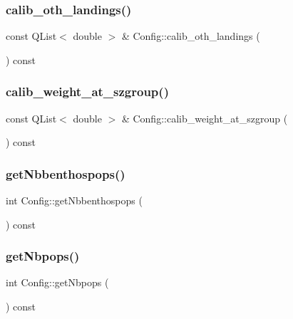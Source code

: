 \subsubsection{\texorpdfstring{calib\_oth\_landings()}{calib\_oth\_landings()}}
{\footnotesize\ttfamily const Q\+List$<$ double $>$ \& Config\+::calib\+\_\+oth\+\_\+landings (\begin{DoxyParamCaption}{ }\end{DoxyParamCaption}) const}

\mbox{\label{class_config_a27d6d3da20e0caa6d8aa74426293e845}} 
\subsubsection{\texorpdfstring{calib\_weight\_at\_szgroup()}{calib\_weight\_at\_szgroup()}}
{\footnotesize\ttfamily const Q\+List$<$ double $>$ \& Config\+::calib\+\_\+weight\+\_\+at\+\_\+szgroup (\begin{DoxyParamCaption}{ }\end{DoxyParamCaption}) const}

\mbox{\label{class_config_a195f6e3a5e3a3e35a41716ec53fa0365}} 
\subsubsection{\texorpdfstring{getNbbenthospops()}{getNbbenthospops()}}
{\footnotesize\ttfamily int Config\+::get\+Nbbenthospops (\begin{DoxyParamCaption}{ }\end{DoxyParamCaption}) const}

\mbox{\label{class_config_ab202e96cdfea3ca5a6ef3025219c502c}} 
\subsubsection{\texorpdfstring{getNbpops()}{getNbpops()}}
{\footnotesize\ttfamily int Config\+::get\+Nbpops (\begin{DoxyParamCaption}{ }\end{DoxyParamCaption}) const}

